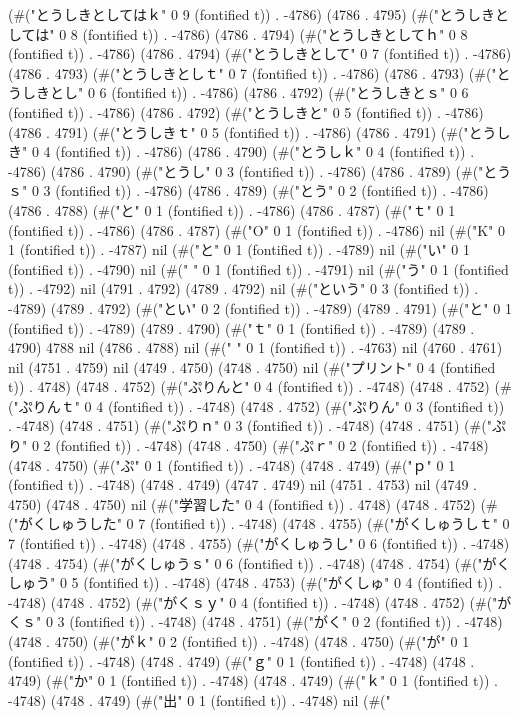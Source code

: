 (#("とうしきとしてはｋ" 0 9 (fontified t)) . -4786) (4786 . 4795) (#("とうしきとしては" 0 8 (fontified t)) . -4786) (4786 . 4794) (#("とうしきとしてｈ" 0 8 (fontified t)) . -4786) (4786 . 4794) (#("とうしきとして" 0 7 (fontified t)) . -4786) (4786 . 4793) (#("とうしきとしｔ" 0 7 (fontified t)) . -4786) (4786 . 4793) (#("とうしきとし" 0 6 (fontified t)) . -4786) (4786 . 4792) (#("とうしきとｓ" 0 6 (fontified t)) . -4786) (4786 . 4792) (#("とうしきと" 0 5 (fontified t)) . -4786) (4786 . 4791) (#("とうしきｔ" 0 5 (fontified t)) . -4786) (4786 . 4791) (#("とうしき" 0 4 (fontified t)) . -4786) (4786 . 4790) (#("とうしｋ" 0 4 (fontified t)) . -4786) (4786 . 4790) (#("とうし" 0 3 (fontified t)) . -4786) (4786 . 4789) (#("とうｓ" 0 3 (fontified t)) . -4786) (4786 . 4789) (#("とう" 0 2 (fontified t)) . -4786) (4786 . 4788) (#("と" 0 1 (fontified t)) . -4786) (4786 . 4787) (#("ｔ" 0 1 (fontified t)) . -4786) (4786 . 4787) (#("O" 0 1 (fontified t)) . -4786) nil (#("K" 0 1 (fontified t)) . -4787) nil (#("と" 0 1 (fontified t)) . -4789) nil (#("い" 0 1 (fontified t)) . -4790) nil (#("
" 0 1 (fontified t)) . -4791) nil (#("う" 0 1 (fontified t)) . -4792) nil (4791 . 4792) (4789 . 4792) nil (#("という" 0 3 (fontified t)) . -4789) (4789 . 4792) (#("とい" 0 2 (fontified t)) . -4789) (4789 . 4791) (#("と" 0 1 (fontified t)) . -4789) (4789 . 4790) (#("ｔ" 0 1 (fontified t)) . -4789) (4789 . 4790) 4788 nil (4786 . 4788) nil (#("
" 0 1 (fontified t)) . -4763) nil (4760 . 4761) nil (4751 . 4759) nil (4749 . 4750) (4748 . 4750) nil (#("プリント" 0 4 (fontified t)) . 4748) (4748 . 4752) (#("ぷりんと" 0 4 (fontified t)) . -4748) (4748 . 4752) (#("ぷりんｔ" 0 4 (fontified t)) . -4748) (4748 . 4752) (#("ぷりん" 0 3 (fontified t)) . -4748) (4748 . 4751) (#("ぷりｎ" 0 3 (fontified t)) . -4748) (4748 . 4751) (#("ぷり" 0 2 (fontified t)) . -4748) (4748 . 4750) (#("ぷｒ" 0 2 (fontified t)) . -4748) (4748 . 4750) (#("ぷ" 0 1 (fontified t)) . -4748) (4748 . 4749) (#("ｐ" 0 1 (fontified t)) . -4748) (4748 . 4749) (4747 . 4749) nil (4751 . 4753) nil (4749 . 4750) (4748 . 4750) nil (#("学習した" 0 4 (fontified t)) . 4748) (4748 . 4752) (#("がくしゅうした" 0 7 (fontified t)) . -4748) (4748 . 4755) (#("がくしゅうしｔ" 0 7 (fontified t)) . -4748) (4748 . 4755) (#("がくしゅうし" 0 6 (fontified t)) . -4748) (4748 . 4754) (#("がくしゅうｓ" 0 6 (fontified t)) . -4748) (4748 . 4754) (#("がくしゅう" 0 5 (fontified t)) . -4748) (4748 . 4753) (#("がくしゅ" 0 4 (fontified t)) . -4748) (4748 . 4752) (#("がくｓｙ" 0 4 (fontified t)) . -4748) (4748 . 4752) (#("がくｓ" 0 3 (fontified t)) . -4748) (4748 . 4751) (#("がく" 0 2 (fontified t)) . -4748) (4748 . 4750) (#("がｋ" 0 2 (fontified t)) . -4748) (4748 . 4750) (#("が" 0 1 (fontified t)) . -4748) (4748 . 4749) (#("ｇ" 0 1 (fontified t)) . -4748) (4748 . 4749) (#("か" 0 1 (fontified t)) . -4748) (4748 . 4749) (#("ｋ" 0 1 (fontified t)) . -4748) (4748 . 4749) (#("出" 0 1 (fontified t)) . -4748) nil (#("
